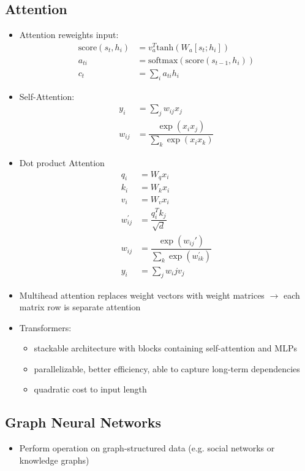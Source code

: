\subsection{Attention}
\begin{itemize}
	\item Attention reweights input:
	\begin{equation*}
		\begin{split}
		\mathrm{score}(s_t,h_i) &= v_a^T \mathrm{tanh}(W_a[s_t;h_i]) \\
		a_{ti} &= \mathrm{softmax}(\mathrm{score}(s_{t-1},h_i)) \\
		c_t &= \sum_i a_{ti} h_i
		\end{split}
	\end{equation*}
	\item Self-Attention:
	\begin{equation*}
		\begin{split}
			y_i &= \sum_j w_{ij} x_j \\
			w_{ij} &= \dfrac{\exp (x_i x_j)}{\sum_k \exp (x_i x_k)}
		\end{split}
	\end{equation*}
	\item Dot product Attention
	\begin{equation*}
		\begin{split}
			q_i &= W_q x_i \\
			k_i &= W_k x_i \\
			v_i &= W_v x_i \\
			w_{ij}^' &= \dfrac{q_i^T k_j}{\sqrt{d}} \\
			w_{ij} &= \dfrac{\exp(w_{ij}')}{\sum_k \exp(w_{ik}^')} \\
			y_i &= \sum_j w_ij v_j
		\end{split}
	\end{equation*}
	\item Multihead attention replaces weight vectors with weight matrices $\rightarrow$ each matrix row is separate attention
	\item Transformers:
	\begin{itemize}
		\item stackable architecture with blocks containing self-attention and MLPs
		\item parallelizable, better efficiency, able to capture long-term dependencies
		\item quadratic cost to input length
	\end{itemize}
\end{itemize}
\subsection{Graph Neural Networks}
\begin{itemize}
	\item Perform operation on graph-structured data (e.g. social networks or knowledge graphs)
\end{itemize}
